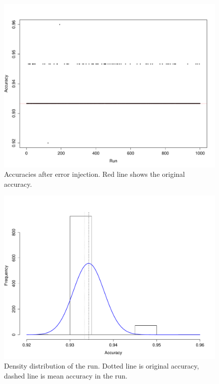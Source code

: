 \documentclass{article}\usepackage[]{graphicx}\usepackage[]{color}
\begin{document}
\begin{figure}
  \centering
  \includegraphics[width=\textwidth]{sim}
  \caption{Accuracies after error injection.  Red line shows the original accuracy.}\label{fig:sim}
\end{figure}

\begin{figure}
  \centering
  \includegraphics[width=\textwidth]{density}
  \caption{Density distribution of the run.  Dotted line is original accuracy, dashed line is mean accuracy in the run.}\label{fig:density}
\end{figure}
\end{document}
